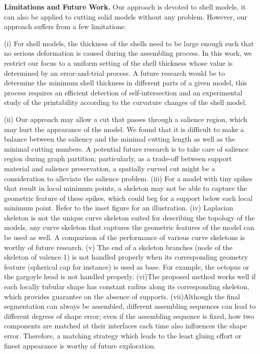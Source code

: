 \textbf{Limitations and Future Work.} Our approach is devoted to shell models, it can also be applied to cutting solid models without any problem. However, our approach suffers from a few limitations:

(i) For shell models, the thickness of the shells need to be large enough such that no serious deformation is caused during the assembling process. In this work, we restrict our focus to a uniform setting of the shell thickness whose value is determined by an error-and-trial process. A future research would be to determine the minimum shell thickness in different parts of a given model, this process requires an efficient detection of self-intersection and an experimental study of the printability according to the curvature changes of the shell model.

(ii) Our approach may allow a cut that passes through a salience region, which may hurt the appearance of the model. We found that it is difficult to make a balance between the saliency and the minimal cutting length as well as the minimal cutting numbers. A potential future research is to take care of salience region during graph partition; particularly, as a trade-off between support material and salience preservation, a spatially curved cut might be a consideration to alleviate the salience problem.
(iii) For a model with tiny spikes that result in local minimum points, a skeleton may not be able to capture the geometric feature of these spikes, which could beg for a support below each local minimum point. Refer to the inset figure for an illustration.
(iv) Laplacian skeleton is not the unique curve skeleton suited for describing the topology of the models, any curve skeleton that captures the geometric features of the model can be used as well. A comparison of the performance of various curve skeletons is worthy of future research.
(v) The end of a skeleton branches (node of the skeleton of valence 1) is not handled properly when its corresponding geometry feature (spherical cap for instance) is used as base. For example, the octopus or the gargoyle head is not handled properly.
(vi)The proposed method works well if each locally tubular shape has constant radius along its corresponding skeleton, which provides guarantee on the absence of supports.
(vii)Although the final segmentation can always be assembled, different assembling sequences can lead to different degrees of shape error; even if the assembling sequence is fixed, how two components are matched at their interfaces each time also influences the shape error. Therefore, a matching strategy which leads to the least gluing effort or finest appearance is worthy of future exploration.



